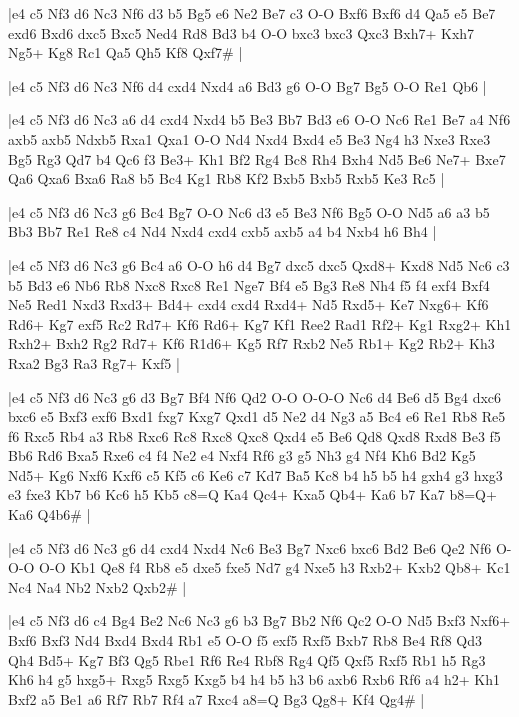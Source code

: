 \whitename{}
\blackname{}
\makegametitle
|e4 c5 Nf3 d6 Nc3 Nf6 d3 b5 Bg5 e6 Ne2 Be7 c3 O-O Bxf6 Bxf6 d4 Qa5 e5 Be7 exd6 Bxd6 dxc5 Bxc5 Ned4 Rd8 Bd3 b4 O-O bxc3 bxc3 Qxc3 Bxh7+ Kxh7 Ng5+ Kg8 Rc1 Qa5 Qh5 Kf8 Qxf7\#  |

\whitename{}
\blackname{}
\makegametitle
|e4 c5 Nf3 d6 Nc3 Nf6 d4 cxd4 Nxd4 a6 Bd3 g6 O-O Bg7 Bg5 O-O Re1 Qb6  |

\whitename{}
\blackname{}
\makegametitle
|e4 c5 Nf3 d6 Nc3 a6 d4 cxd4 Nxd4 b5 Be3 Bb7 Bd3 e6 O-O Nc6 Re1 Be7 a4 Nf6 axb5 axb5 Ndxb5 Rxa1 Qxa1 O-O Nd4 Nxd4 Bxd4 e5 Be3 Ng4 h3 Nxe3 Rxe3 Bg5 Rg3 Qd7 b4 Qc6 f3 Be3+ Kh1 Bf2 Rg4 Bc8 Rh4 Bxh4 Nd5 Be6 Ne7+ Bxe7 Qa6 Qxa6 Bxa6 Ra8 b5 Bc4 Kg1 Rb8 Kf2 Bxb5 Bxb5 Rxb5 Ke3 Rc5  |

\whitename{}
\blackname{}
\makegametitle
|e4 c5 Nf3 d6 Nc3 g6 Bc4 Bg7 O-O Nc6 d3 e5 Be3 Nf6 Bg5 O-O Nd5 a6 a3 b5 Bb3 Bb7 Re1 Re8 c4 Nd4 Nxd4 cxd4 cxb5 axb5 a4 b4 Nxb4 h6 Bh4  |

\whitename{}
\blackname{}
\makegametitle
|e4 c5 Nf3 d6 Nc3 g6 Bc4 a6 O-O h6 d4 Bg7 dxc5 dxc5 Qxd8+ Kxd8 Nd5 Nc6 c3 b5 Bd3 e6 Nb6 Rb8 Nxc8 Rxc8 Re1 Nge7 Bf4 e5 Bg3 Re8 Nh4 f5 f4 exf4 Bxf4 Ne5 Red1 Nxd3 Rxd3+ Bd4+ cxd4 cxd4 Rxd4+ Nd5 Rxd5+ Ke7 Nxg6+ Kf6 Rd6+ Kg7 exf5 Rc2 Rd7+ Kf6 Rd6+ Kg7 Kf1 Ree2 Rad1 Rf2+ Kg1 Rxg2+ Kh1 Rxh2+ Bxh2 Rg2 Rd7+ Kf6 R1d6+ Kg5 Rf7 Rxb2 Ne5 Rb1+ Kg2 Rb2+ Kh3 Rxa2 Bg3 Ra3 Rg7+ Kxf5  |

\whitename{}
\blackname{}
\makegametitle
|e4 c5 Nf3 d6 Nc3 g6 d3 Bg7 Bf4 Nf6 Qd2 O-O O-O-O Nc6 d4 Be6 d5 Bg4 dxc6 bxc6 e5 Bxf3 exf6 Bxd1 fxg7 Kxg7 Qxd1 d5 Ne2 d4 Ng3 a5 Bc4 e6 Re1 Rb8 Re5 f6 Rxc5 Rb4 a3 Rb8 Rxc6 Rc8 Rxc8 Qxc8 Qxd4 e5 Be6 Qd8 Qxd8 Rxd8 Be3 f5 Bb6 Rd6 Bxa5 Rxe6 c4 f4 Ne2 e4 Nxf4 Rf6 g3 g5 Nh3 g4 Nf4 Kh6 Bd2 Kg5 Nd5+ Kg6 Nxf6 Kxf6 c5 Kf5 c6 Ke6 c7 Kd7 Ba5 Kc8 b4 h5 b5 h4 gxh4 g3 hxg3 e3 fxe3 Kb7 b6 Kc6 h5 Kb5 c8=Q Ka4 Qc4+ Kxa5 Qb4+ Ka6 b7 Ka7 b8=Q+ Ka6 Q4b6\#  |

\whitename{}
\blackname{}
\makegametitle
|e4 c5 Nf3 d6 Nc3 g6 d4 cxd4 Nxd4 Nc6 Be3 Bg7 Nxc6 bxc6 Bd2 Be6 Qe2 Nf6 O-O-O O-O Kb1 Qe8 f4 Rb8 e5 dxe5 fxe5 Nd7 g4 Nxe5 h3 Rxb2+ Kxb2 Qb8+ Kc1 Nc4 Na4 Nb2 Nxb2 Qxb2\#  |

\whitename{}
\blackname{}
\makegametitle
|e4 c5 Nf3 d6 c4 Bg4 Be2 Nc6 Nc3 g6 b3 Bg7 Bb2 Nf6 Qc2 O-O Nd5 Bxf3 Nxf6+ Bxf6 Bxf3 Nd4 Bxd4 Bxd4 Rb1 e5 O-O f5 exf5 Rxf5 Bxb7 Rb8 Be4 Rf8 Qd3 Qh4 Bd5+ Kg7 Bf3 Qg5 Rbe1 Rf6 Re4 Rbf8 Rg4 Qf5 Qxf5 Rxf5 Rb1 h5 Rg3 Kh6 h4 g5 hxg5+ Rxg5 Rxg5 Kxg5 b4 h4 b5 h3 b6 axb6 Rxb6 Rf6 a4 h2+ Kh1 Bxf2 a5 Be1 a6 Rf7 Rb7 Rf4 a7 Rxc4 a8=Q Bg3 Qg8+ Kf4 Qg4\#  |

